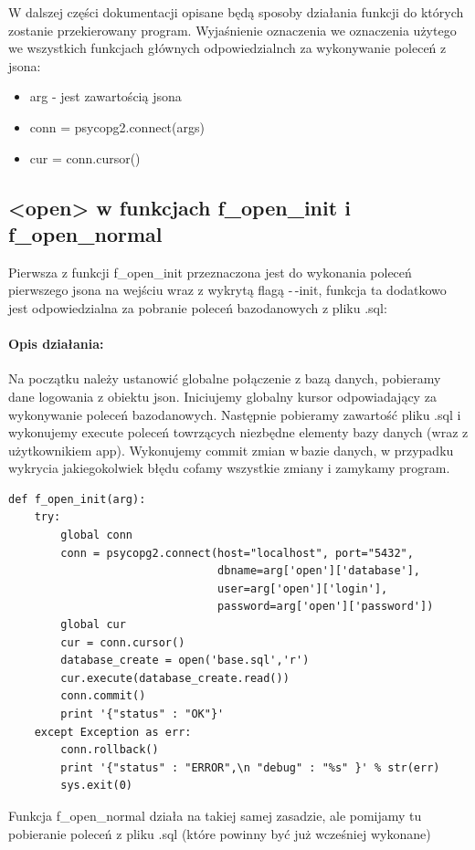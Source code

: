 \documentclass{article}
\begin{document}
W dalszej części dokumentacji opisane będą sposoby działania funkcji do których zostanie przekierowany program.
Wyjaśnienie oznaczenia we oznaczenia użytego we wszystkich funkcjach głównych odpowiedzialnch za wykonywanie poleceń z jsona:
\begin{itemize}
    \item arg - jest zawartością jsona
    \item conn = psycopg2.connect(args)
    \item cur = conn.cursor()
\end{itemize}







\newpage
\subsection{<open> w funkcjach f\_open\_init i f\_open\_normal}
Pierwsza z funkcji f\_open\_init przeznaczona jest do wykonania poleceń pierwszego jsona na wejściu wraz z wykrytą flagą -\,-init, funkcja ta dodatkowo jest odpowiedzialna za pobranie poleceń bazodanowych z pliku .sql:
\paragraph{Opis działania: }
    Na początku należy ustanowić globalne połączenie z bazą danych,
    pobieramy dane logowania z obiektu json. Iniciujemy globalny
    kursor odpowiadający za wykonywanie poleceń bazodanowych. 
    Następnie pobieramy zawartość pliku .sql i wykonujemy execute 
    poleceń towrzących niezbędne elementy bazy danych (wraz z użytkownikiem app).
    Wykonujemy commit zmian w\,bazie danych, w przypadku wykrycia 
    jakiegokolwiek błędu cofamy wszystkie zmiany i zamykamy program.
\begin{verbatim}
def f_open_init(arg):
    try:
        global conn
        conn = psycopg2.connect(host="localhost", port="5432",
                                dbname=arg['open']['database'],
                                user=arg['open']['login'],
                                password=arg['open']['password'])
        global cur
        cur = conn.cursor()
        database_create = open('base.sql','r') 
        cur.execute(database_create.read())
        conn.commit()
        print '{"status" : "OK"}'
    except Exception as err:
        conn.rollback()
        print '{"status" : "ERROR",\n "debug" : "%s" }' % str(err)
        sys.exit(0)  
\end{verbatim}
Funkcja f\_open\_normal działa na takiej samej zasadzie, ale pomijamy tu pobieranie poleceń z pliku .sql (które powinny być już wcześniej wykonane)
\end{document}
